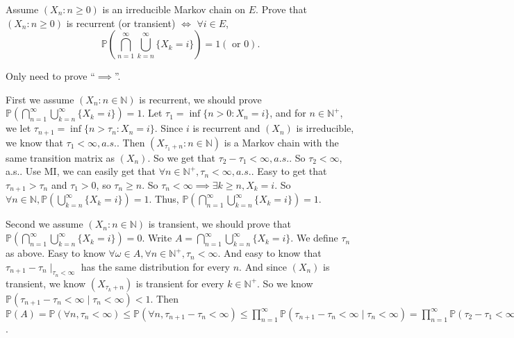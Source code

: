 \documentclass{ctexart}
\newif\ifpreface
\begin{document}
\large
\setlength{\baselineskip}{1.2em}
\ifpreface
  
\else
\fi
{}
\begin{problem}\label{pro:1}
  Assume \((X_n:n \geq 0)\) is an irreducible Markov chain on \(E\).
  Prove that \((X_n:n \geq 0)\) is recurrent (or transient) \(\iff\)
  \(\forall i \in E\),
  \[
    \mathbb{P}\left(\bigcap_{n=1}^{\infty} \bigcup_{k=n}^{\infty} \{X_k=i\}\right)=1 (\text{ or } 0).
  \]
\end{problem}
\begin{solution}
  Only need to prove ``\(\implies\)''.

  First we assume \((X_n:n \in \mathbb{N})\) is recurrent, we should prove \(\mathbb{P}\left(\bigcap_{n=1}^{\infty} \bigcup_{k=n}^{\infty} \{X_k=i\}\right)=1\).
  Let \(\tau_1=\inf \{n > 0:X_n=i\}\), and for \(n \in \mathbb{N}^+\), we let \(\tau_{n+1}=\inf \{n > \tau_n:X_n=i\}\).
  Since \(i\) is recurrent and \((X_n)\) is irreducible, we know that \(\tau_1<\infty,a.s.\).
  Then \((X_{\tau_1+n}:n \in \mathbb{N})\) is a Markov chain with the same transition matrix as \((X_n)\).
  So we get that \(\tau_2-\tau_1 < \infty,a. s.\). So \(\tau_2<\infty\), a.s..
  Use MI, we can easily get that \(\forall n \in \mathbb{N}^+,\tau_n<\infty,a. s.\).
  Easy to get that \(\tau_{n+1}>\tau_n\) and \(\tau_1>0\), so \(\tau_n \geq n\).
  So \(\tau_n<\infty \implies \exists k \geq n,X_k=i\).
  So \(\forall n \in \mathbb{N},\mathbb{P}\left(  \bigcup_{k=n}^{\infty} \{X_k=i\}\right)=1\).
  Thus, \(\mathbb{P}\left(\bigcap_{n=1}^{\infty} \bigcup_{k=n}^{\infty} \{X_k=i\}\right)=1\).

  Second we assume \((X_n:n \in \mathbb{N})\) is transient, we should prove that \(\mathbb{P}\left(\bigcap_{n=1}^{\infty} \bigcup_{k=n}^{\infty} \{X_k=i\}\right)=0\).
  Write \(A=\bigcap_{n=1}^{\infty} \bigcup_{k=n}^{\infty} \{X_k=i\}\).
  We define \(\tau_n \) as above. Easy to know \(\forall \omega \in A,\forall n \in \mathbb{N}^+,\tau_n<\infty\).
  And easy to know that \(\tau_{n+1}-\tau_n \mid_{\tau_n<\infty}\) has the same distribution for every \(n\).
  And since \((X_n)\) is transient, we know \((X_{\tau_k+n})\) is transient for every \(k \in \mathbb{N}^+\).
  So we know \(\mathbb{P}(\tau_{n+1}-\tau_n<\infty \mid \tau_n<\infty)<1\).
  Then \(\mathbb{P}(A)=\mathbb{P}(\forall n,\tau_n < \infty) \leq \mathbb{P}(\forall n,\tau_{n+1}-\tau_n<\infty) \leq \prod_{n=1}^{\infty} \mathbb{P}(\tau_{n+1}-\tau_n<\infty \mid \tau_n<\infty)=\prod_{n=1}^{\infty} \mathbb{P}(\tau_2-\tau_1<\infty \mid \tau_1<\infty)=0\).
\end{solution}
\end{document}
